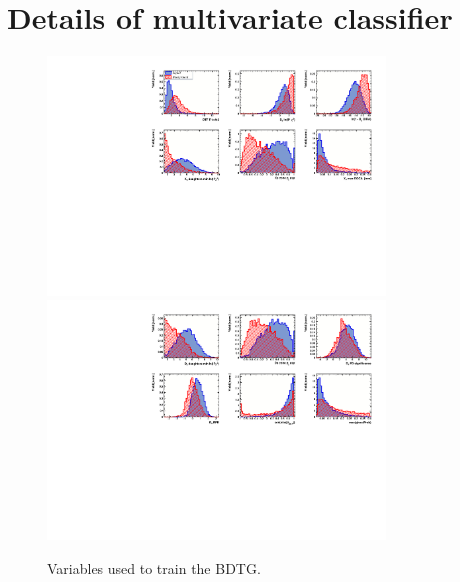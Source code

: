 
\section{Details of multivariate classifier}
\label{sec:appendix_BDT}

\begin{figure}[h]
\centering
\includegraphics[height=!,width=0.8\textwidth]{figs/TMVA/BDTG_Data_run1_t0_even/variables_id_c1.pdf}
\includegraphics[height=!,width=0.8\textwidth]{figs/TMVA/BDTG_Data_run1_t0_even/variables_id_c2.pdf}
\caption{Variables used to train the BDTG.}
\label{fig:}
\end{figure}

